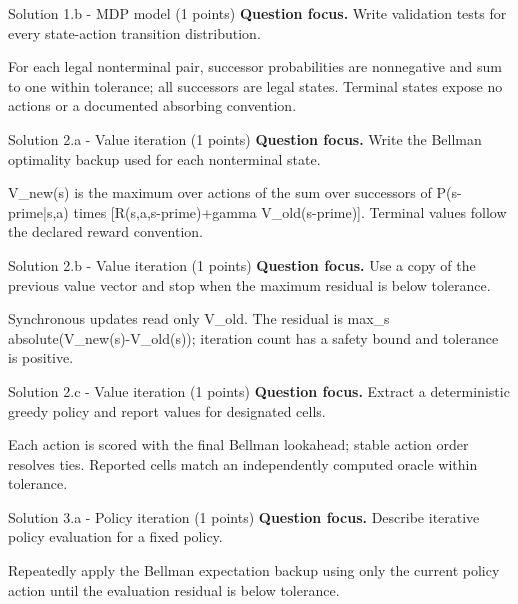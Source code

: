 \documentclass[aspectratio=169,11pt]{beamer}
\begin{document}
\begin{frame}{Solution 1.b - MDP model (1 points)}
\small
\textbf{Question focus.} Write validation tests for every state-action transition distribution.

\vspace{0.25cm}
\answerlabel For each legal nonterminal pair, successor probabilities are nonnegative and sum to one within tolerance; all successors are legal states. Terminal states expose no actions or a documented absorbing convention.
\end{frame}

\begin{frame}{Solution 2.a - Value iteration (1 points)}
\small
\textbf{Question focus.} Write the Bellman optimality backup used for each nonterminal state.

\vspace{0.25cm}
\answerlabel V\_new(s) is the maximum over actions of the sum over successors of P(s-prime|s,a) times [R(s,a,s-prime)+gamma V\_old(s-prime)]. Terminal values follow the declared reward convention.
\end{frame}

\begin{frame}{Solution 2.b - Value iteration (1 points)}
\small
\textbf{Question focus.} Use a copy of the previous value vector and stop when the maximum residual is below tolerance.

\vspace{0.25cm}
\answerlabel Synchronous updates read only V\_old. The residual is max\_s absolute(V\_new(s)-V\_old(s)); iteration count has a safety bound and tolerance is positive.
\end{frame}

\begin{frame}{Solution 2.c - Value iteration (1 points)}
\small
\textbf{Question focus.} Extract a deterministic greedy policy and report values for designated cells.

\vspace{0.25cm}
\answerlabel Each action is scored with the final Bellman lookahead; stable action order resolves ties. Reported cells match an independently computed oracle within tolerance.
\end{frame}

\begin{frame}{Solution 3.a - Policy iteration (1 points)}
\small
\textbf{Question focus.} Describe iterative policy evaluation for a fixed policy.

\vspace{0.25cm}
\answerlabel Repeatedly apply the Bellman expectation backup using only the current policy action until the evaluation residual is below tolerance.
\end{frame}
\end{document}
